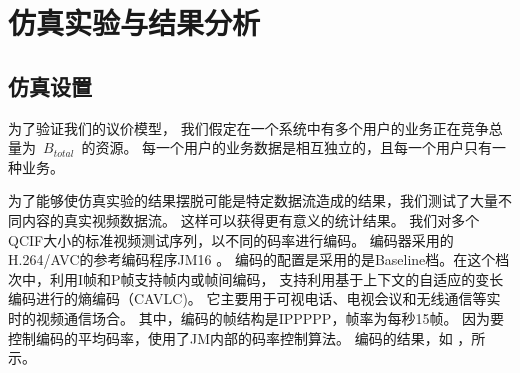 \section{仿真实验与结果分析}
\subsection{仿真设置}
为了验证我们的议价模型，
我们假定在一个系统中有多个用户的业务正在竞争总量为~$B_{total}$~的资源。
每一个用户的业务数据是相互独立的，且每一个用户只有一种业务。

为了能够使仿真实验的结果摆脱可能是特定数据流造成的结果，我们测试了大量不同内容的真实视频数据流。
这样可以获得更有意义的统计结果。
 我们对多个QCIF大小的标准视频测试序列，以不同的码率进行编码。
编码器采用的H.264/AVC的参考编码程序JM16 \cite{h_264_codec}。
编码的配置是采用的是Baseline档。在这个档次中，利用I帧和P帧支持帧内或帧间编码，
支持利用基于上下文的自适应的变长编码进行的熵编码（CAVLC)。
它主要用于可视电话、电视会议和无线通信等实时的视频通信场合\cite{BiHouJie2009}。
其中，编码的帧结构是IPPPPP，帧率为每秒15帧。
因为要控制编码的平均码率，使用了JM内部的码率控制算法。
编码的结果，如 ，所示。
